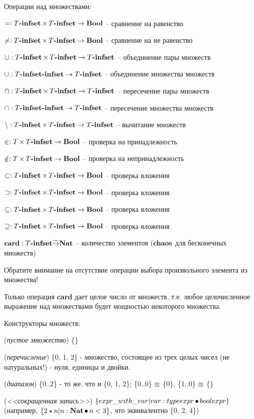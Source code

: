 \documentclass[14pt, twoside]{extreport}
\begin{document}
Операции над множествами:
\begin{list}{}{}
\item $= : T\textbf{-infset} \mathop{\times} T\textbf{-infset} \rightarrow \textbf{Bool}$ -- сравнение на равенство
\item $\neq : T\textbf{-infset} \mathop{\times} T\textbf{-infset} \rightarrow \textbf{Bool}$ -- сравнение на не равенство
\item $\mathop{\cup}: T\textbf{-infset} \mathop{\times} T\textbf{-infset} \rightarrow T\textbf{-infset}$ -- объединение пары множеств
\item $\mathop{\cup}: T\textbf{-infset}\textbf{-infset} \rightarrow T\textbf{-infset}$ -- объединение множества множеств
\item $\mathop{\cap}: T\textbf{-infset} \mathop{\times} T\textbf{-infset} \rightarrow T\textbf{-infset}$ -- пересечение пары множеств
\item $\mathop{\cap}: T\textbf{-infset}\textbf{-infset} \rightarrow T\textbf{-infset}$ -- пересечение множества множеств
\item $\mathop{\setminus}: T\textbf{-infset} \mathop{\times} T\textbf{-infset} \rightarrow T\textbf{-infset}$ -- вычитание множеств
\item $\in: T \mathop{\times} T\textbf{-infset} \rightarrow \textbf{Bool}$ -- проверка на принадлежность
\item $\notin: T \mathop{\times} T\textbf{-infset} \rightarrow \textbf{Bool}$ -- проверка на непринадлежность
\item $\subset: T\textbf{-infset} \mathop{\times} T\textbf{-infset} \rightarrow \textbf{Bool}$ -- проверка вложения
\item $\supset: T\textbf{-infset} \mathop{\times} T\textbf{-infset} \rightarrow \textbf{Bool}$ -- проверка вложения
\item $\subseteq: T\textbf{-infset} \mathop{\times} T\textbf{-infset} \rightarrow \textbf{Bool}$ -- проверка вложения
\item $\supseteq: T\textbf{-infset} \mathop{\times} T\textbf{-infset} \rightarrow \textbf{Bool}$ -- проверка вложения
\item $\mathop{\textbf{card}}: T\textbf{-infset} \widetilde{\rightarrow} \textbf{Nat}$ -- количество элементов
($\textbf{chaos}$ для бесконечных множеств)
\end{list}

Обратите внимание на отсутствие операции выбора произвольного элемента из множества!

Только операция \textbf{card} дает целое число от множеств, т.е. любое целочисленное выражение над множествами будет мощностью некоторого множества.

Конструкторы множеств:
\begin{list}{}{}
\item (\emph{пустое множество}) \{\}
\item (\emph{перечисление}) \{0, 1, 2\} - множество, состоящее из трех целых чисел (не
натуральных!) - нуля, единицы и двойки.
\item (\emph{диапазон}) \{0..2\} -  то же, что и \{0, 1, 2\};
\{0..0\} $\mathop{\equiv}$ \{0\}, \{1..0\} $\mathop{\equiv}$ \{\}
\item (\emph{<<сокращенная запись>>}) $\{ expr\_with\_var | var : typeexpr
\mathop{\bullet} boolexpr\}$ (например, $\{2 \star n | n : \textbf{Nat} \mathop{\bullet} n < 3
\}$, что эквивалентно \{0, 2, 4\})
\end{list}
\end{document}
